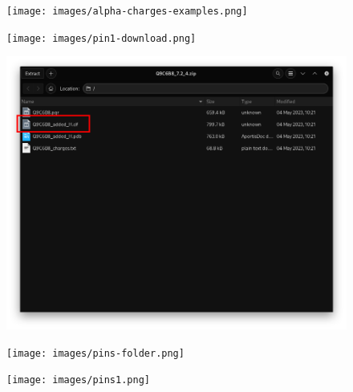 \documentclass[
]{beamer}
\begin{document}
\begin{frame}
  \begin{figure}
    \texttt{[image: images/alpha-charges-examples.png]}
  \end{figure}
\end{frame}

\begin{frame}
  \begin{figure}
    \texttt{[image: images/pin1-download.png]}
  \end{figure}
\end{frame}

\begin{frame}
  \begin{figure}
    \includegraphics[width=1\textwidth,height=\textheight,keepaspectratio]{images/folder.png}
  \end{figure}
\end{frame}

\begin{frame}
  \begin{figure}
    \texttt{[image: images/pins-folder.png]}
  \end{figure}
\end{frame}

\begin{frame}
  \begin{figure}
    \texttt{[image: images/pins1.png]}
  \end{figure}
\end{frame}
\end{document}
